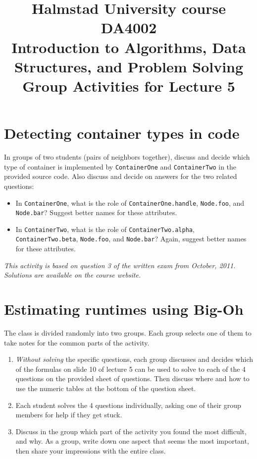\documentclass[a4paper]{article}
\begin{document}
\title{
  {\small
    Halmstad University course DA4002\\
    Introduction to Algorithms, Data Structures, and Problem Solving\\
  }
  Group Activities for Lecture 5
}
\maketitle



\section{Detecting container types in code}

In groups of two students (pairs of neighbors together), discuss and decide which type of container is implemented by \texttt{ContainerOne} and \texttt{ContainerTwo} in the provided source code.
Also discuss and decide on answers for the two related questions:
\begin{itemize}
\item
  In \texttt{ContainerOne}, what is the role of \texttt{ContainerOne.handle}, \texttt{Node.foo}, and \texttt{Node.bar}?
  Suggest better names for these attributes.
\item
  In \texttt{ContainerTwo}, what is the role of \texttt{ContainerTwo.alpha}, \texttt{ContainerTwo.beta}, \texttt{Node.foo}, and \texttt{Node.bar}?
  Again, suggest better names for these attributes.
\end{itemize}

\emph{
  This activity is based on question 3 of the written exam from October, 2011.
  Solutions are available on the course website.
}



\section{Estimating runtimes using Big-Oh}

The class is divided randomly into two groups.
Each group selects one of them to take notes for the common parts of the activity.
\begin{enumerate}
\item
  \emph{Without solving} the specific questions, each group discusses and decides which of the formulas on slide 10 of lecture 5 can be used to solve to each of the 4 questions on the provided sheet of questions.
  Then discuss where and how to use the numeric tables at the bottom of the question sheet.
\item
  Each student solves the 4 questions individually, asking one of their group members for help if they get stuck.
\item
  Discuss in the group which part of the activity you found the most difficult, and why.
  As a group, write down one aspect that seems the most important, then share your impressions with the entire class.
\end{enumerate}
\end{document}

